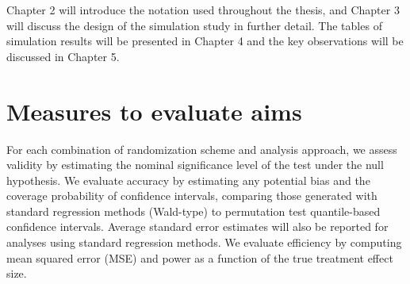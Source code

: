 Chapter 2 will introduce the notation used throughout the thesis, and Chapter 3 will discuss the design of the simulation study in further detail.  
The tables of simulation results will be presented in Chapter 4 and the key observations will be discussed in Chapter 5.

\section{Measures to evaluate aims}
For each combination of randomization scheme and analysis approach, we assess validity by estimating the nominal significance level of the test under the null hypothesis.  
We evaluate accuracy by estimating any potential bias and the coverage probability of confidence intervals, comparing those generated with standard regression methods (Wald-type) to permutation test quantile-based confidence intervals.  
Average standard error estimates will also be reported for analyses using standard regression methods.  
We evaluate efficiency by computing mean squared error (MSE) and power as a function of the true treatment effect size. 

